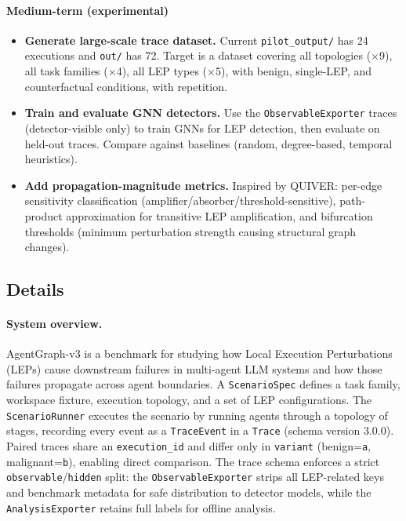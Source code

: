 \paragraph{Medium-term (experimental)}
\begin{itemize}
    \item \textbf{Generate large-scale trace dataset.} Current \texttt{pilot\_output/} has 24 executions and \texttt{out/} has 72. Target is a dataset covering all topologies ($\times$9), all task families ($\times$4), all LEP types ($\times$5), with benign, single-LEP, and counterfactual conditions, with repetition.
    \item \textbf{Train and evaluate GNN detectors.} Use the \texttt{ObservableExporter} traces (detector-visible only) to train GNNs for LEP detection, then evaluate on held-out traces. Compare against baselines (random, degree-based, temporal heuristics).
    \item \textbf{Add propagation-magnitude metrics.} Inspired by QUIVER: per-edge sensitivity classification (amplifier/absorber/threshold-sensitive), path-product approximation for transitive LEP amplification, and bifurcation thresholds (minimum perturbation strength causing structural graph changes).
\end{itemize}

\subsection{Details}

\paragraph{System overview.}
AgentGraph-v3 is a benchmark for studying how Local Execution Perturbations (LEPs) cause downstream failures in multi-agent LLM systems and how those failures propagate across agent boundaries. A \texttt{ScenarioSpec} defines a task family, workspace fixture, execution topology, and a set of LEP configurations. The \texttt{ScenarioRunner} executes the scenario by running agents through a topology of stages, recording every event as a \texttt{TraceEvent} in a \texttt{Trace} (schema version 3.0.0). Paired traces share an \texttt{execution\_id} and differ only in \texttt{variant} (benign=\texttt{a}, malignant=\texttt{b}), enabling direct comparison. The trace schema enforces a strict \texttt{observable}/\texttt{hidden} split: the \texttt{ObservableExporter} strips all LEP-related keys and benchmark metadata for safe distribution to detector models, while the \texttt{AnalysisExporter} retains full labels for offline analysis.

